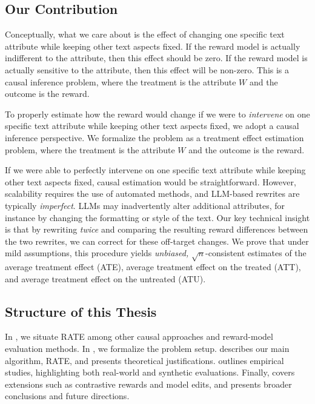 \subsection{Our Contribution}
Conceptually, what we care about is the effect of changing one specific text attribute while keeping other text aspects fixed. If the reward model is actually indifferent to the attribute, then this effect should be zero. If the reward model is actually sensitive to the attribute, then this effect will be non-zero. This is a causal inference problem, where the treatment is the attribute $W$ and the outcome is the reward.

To properly estimate how the reward would change if we were to \emph{intervene} on one specific text attribute while keeping other text aspects fixed, we adopt a causal inference perspective. We formalize the problem as a treatment effect estimation problem, where the treatment is the attribute $W$ and the outcome is the reward.

If we were able to perfectly intervene on one specific text attribute while keeping other text aspects fixed, causal estimation would be straightforward. However, scalability requires the use of automated methods, and LLM-based rewrites are typically \emph{imperfect}. LLMs may inadvertently alter additional attributes, for instance by changing the formatting or style of the text. Our key technical insight is that by rewriting \emph{twice} and comparing the resulting reward differences between the two rewrites, we can correct for these off-target changes. We prove that under mild assumptions, this procedure yields \emph{unbiased,} $\sqrt{n}$-consistent estimates of the average treatment effect (ATE), average treatment effect on the treated (ATT), and average treatment effect on the untreated (ATU).

\subsection{Structure of this Thesis}
In , we situate RATE among other causal approaches and reward-model evaluation methods. In , we formalize the problem setup.  describes our main algorithm, RATE, and  presents theoretical justifications.  outlines empirical studies, highlighting both real-world and synthetic evaluations. Finally,  covers extensions such as contrastive rewards and model edits, and  presents broader conclusions and future directions.

